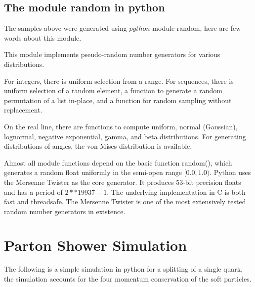 \subsection{The module random in python}

The samples above were generated using $python$ module random, here are few words about this module.
 
This module implements pseudo-random number generators for various distributions.

For integers, there is uniform selection from a range. For sequences, there is uniform selection of a random element, a function to generate a random permutation of a list in-place, and a function for random sampling without replacement.

On the real line, there are functions to compute uniform, normal (Gaussian), lognormal, negative exponential, gamma, and beta distributions. For generating distributions of angles, the von Mises distribution is available.

Almost all module functions depend on the basic function random(), which generates a random float uniformly in the semi-open range $[0.0, 1.0)$. Python uses the Mersenne Twister as the core generator. It produces 53-bit precision floats and has a period of $2**19937-1$. The underlying implementation in C is both fast and threadsafe. The Mersenne Twister is one of the most extensively tested random number generators in existence.
\section{Parton Shower Simulation}
The following is a simple simulation in python for a splitting of a single quark, the simulation accounts for the four momentum conservation of the soft particles.    
